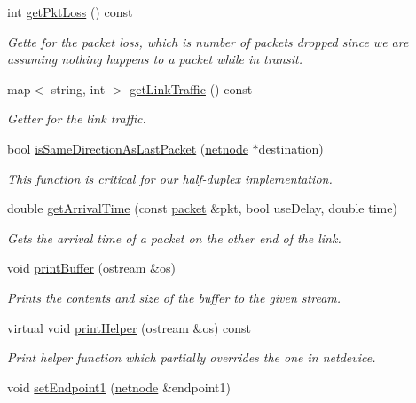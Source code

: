 \begin{DoxyCompactItemize}
int \hyperlink{classnetlink_a16dda9d2d85bd71fd8ea610b4f9eccad}{get\-Pkt\-Loss} () const 
\begin{DoxyCompactList}\small\item\em Gette for the packet loss, which is number of packets dropped since we are assuming nothing happens to a packet while in transit. \end{DoxyCompactList}\item 
map$<$ string, int $>$ \hyperlink{classnetlink_a02c8a58b7691d074f2175bf4ef2cdb4b}{get\-Link\-Traffic} () const 
\begin{DoxyCompactList}\small\item\em Getter for the link traffic. \end{DoxyCompactList}\item 
bool \hyperlink{classnetlink_a4a44ff4a8b3fd1471f2b38d7c94dc48e}{is\-Same\-Direction\-As\-Last\-Packet} (\hyperlink{classnetnode}{netnode} $\ast$destination)
\begin{DoxyCompactList}\small\item\em This function is critical for our half-\/duplex implementation. \end{DoxyCompactList}\item 
double \hyperlink{classnetlink_a1af9572c35dadff0cf25621cbf1d31b0}{get\-Arrival\-Time} (const \hyperlink{classpacket}{packet} \&pkt, bool use\-Delay, double time)
\begin{DoxyCompactList}\small\item\em Gets the arrival time of a packet on the other end of the link. \end{DoxyCompactList}\item 
void \hyperlink{classnetlink_aea20be1cbfffa0ddc1dffa1b20be8305}{print\-Buffer} (ostream \&os)
\begin{DoxyCompactList}\small\item\em Prints the contents and size of the buffer to the given stream. \end{DoxyCompactList}\item 
virtual void \hyperlink{classnetlink_ade945f53c9730fcbeb3c3556da077d99}{print\-Helper} (ostream \&os) const 
\begin{DoxyCompactList}\small\item\em Print helper function which partially overrides the one in {\ttfamily netdevice}. \end{DoxyCompactList}\item 
void \hyperlink{classnetlink_ab92d2503ffd759aaf566bbc5c0f383d5}{set\-Endpoint1} (\hyperlink{classnetnode}{netnode} \&endpoint1)

\end{DoxyCompactItemize}
